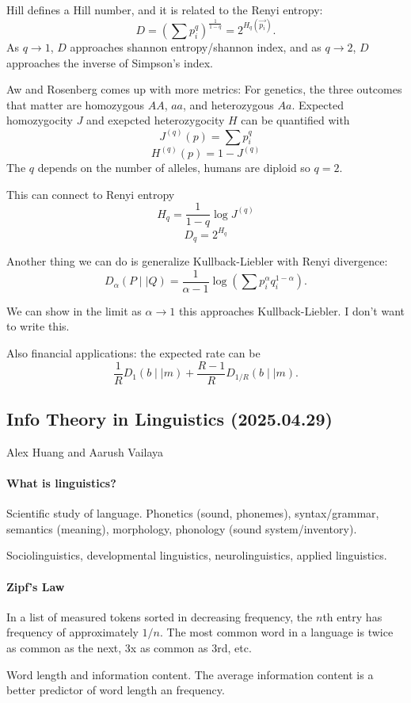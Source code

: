 \documentclass[12pt]{article}
\theoremstyle{remark}
\begin{document}
Hill defines a Hill number, and it is related to the Renyi entropy:
\[D = \left( \sum p_i^q\right)^\frac{1}{1-q} = 2^{H_q(\vec{p_i})}.\]
As $q\to1$, $D$ approaches shannon entropy/shannon index, and as $q\to2$, $D$ approaches the inverse of Simpson's index.

Aw and Rosenberg comes up with more metrics: For genetics, the three outcomes that matter are homozygous $AA$, $aa$, and heterozygous $Aa$. Expected homozygocity $J$ and exepcted heterozygocity $H$ can be quantified with
\[J^{(q)}(p)=\sum p_i^q\]
\[H^{(q)}(p) = 1- J^{(q)}\]
The $q$ depends on the number of alleles, humans are diploid so $q=2$.

This can connect to Renyi entropy
\[H_q = \frac{1}{1-q}\log J^{(q)}\]
\[D_q = 2^{H_q}\]

Another thing we can do is generalize Kullback-Liebler with Renyi divergence:
\[D_\alpha(P\mid\mid Q)=\frac{1}{\alpha - 1} \log \left(\sum p_i^\alpha q_i^{1-\alpha}\right).\]

We can show in the limit as $\alpha\to1$ this approaches Kullback-Liebler. I don't want to write this.

Also financial applications: the expected rate can be
\[\frac{1}{R} D_1(b\mid \mid m) + \frac{R-1}{R} D_{1/R}(b \mid \mid m).\]

\subsection{Info Theory in Linguistics (2025.04.29)}
Alex Huang and Aarush Vailaya

\paragraph{What is linguistics?} Scientific study of language. Phonetics (sound, phonemes), syntax/grammar, semantics (meaning), morphology, phonology (sound system/inventory).

Sociolinguistics, developmental linguistics, neurolinguistics, applied linguistics. 

\paragraph{Zipf's Law} In a list of measured tokens sorted in decreasing frequency, the $n$th entry has frequency of approximately $1/n$. The most common word in a language is twice as common as the next, 3x as common as 3rd, etc.

Word length and information content. The average information content is a better predictor of word length an frequency. 
\end{document}
